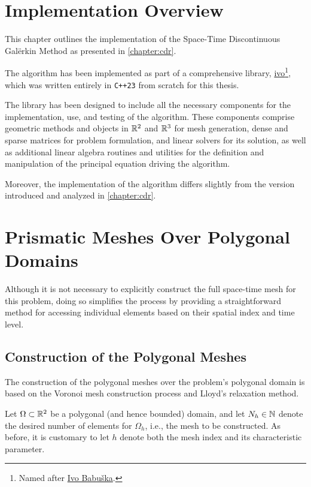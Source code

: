 \section{Implementation Overview}

This chapter outlines the implementation of the Space-Time Discontinuous Galërkin Method as presented in \cref{chapter:cdr}.

The algorithm has been implemented as part of a comprehensive library, \href{https://github.com/diantonioandrea/ivo}{ivo}\footnote{Named after \href{https://en.wikipedia.org/wiki/Ivo_Babuška}{Ivo Babuška}.}, which was written entirely in \lstinline{C++23} from scratch for this thesis.

The library has been designed to include all the necessary components for the implementation, use, and testing of the algorithm. These components comprise geometric methods and objects in $\mathbb{R}^{2}$ and $\mathbb{R}^{3}$ for mesh generation, dense and sparse matrices for problem formulation, and linear solvers for its solution, as well as additional linear algebra routines and utilities for the definition and manipulation of the principal equation driving the algorithm.

Moreover, the implementation of the algorithm differs slightly from the version introduced and analyzed in \cref{chapter:cdr}.

\newpage
\section{Prismatic Meshes Over Polygonal Domains}

Although it is not necessary to explicitly construct the full space-time mesh for this problem, doing so simplifies the process by providing a straightforward method for accessing individual elements based on their spatial index and time level. 

\subsection{Construction of the Polygonal Meshes}

The construction of the polygonal meshes over the problem's polygonal domain is based on the Voronoi mesh construction process and Lloyd's relaxation method.

Let $\Omega \subset \mathbb{R}^{2}$ be a polygonal (and hence bounded) domain, and let $N_h \in \mathbb{N}$ denote the desired number of elements for $\Omega_h$, i.e., the mesh to be constructed. As before, it is customary to let $h$ denote both the mesh index and its characteristic parameter.

